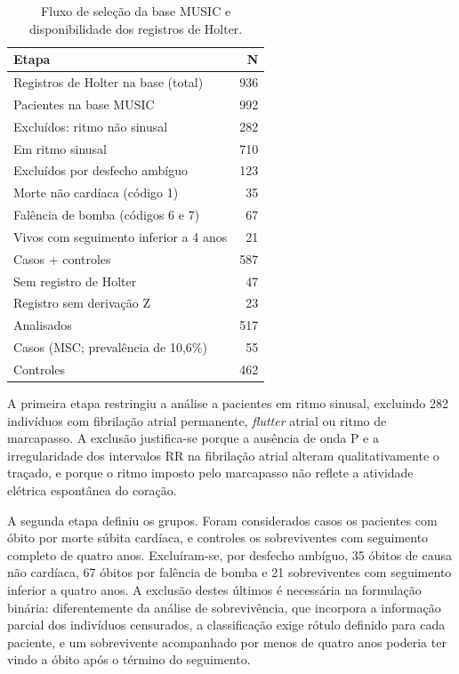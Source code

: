 \begin{table}[htbp]
	\centering
	\caption{Fluxo de seleção da base MUSIC e disponibilidade dos registros de Holter.}
	\label{tab:fluxo-music}
	\begin{tabular}{lr}
		\hline
		\textbf{Etapa}                                & \textbf{N} \\
		\hline
		Registros de Holter na base (total)           & 936        \\
		Pacientes na base MUSIC                       & 992        \\
		\quad Excluídos: ritmo não sinusal            & 282        \\
		Em ritmo sinusal                              & 710        \\
		\quad Excluídos por desfecho ambíguo          & 123        \\
		\qquad Morte não cardíaca (código 1)          & 35         \\
		\qquad Falência de bomba (códigos 6 e 7)      & 67         \\
		\qquad Vivos com seguimento inferior a 4 anos & 21         \\
		Casos + controles                             & 587        \\
		\quad Sem registro de Holter                  & 47         \\
		\quad Registro sem derivação Z                & 23         \\
		Analisados                                    & 517        \\
		\quad Casos (MSC; prevalência de 10,6\%)      & 55         \\
		\quad Controles                               & 462        \\
		\hline
	\end{tabular}
\end{table}


A primeira etapa restringiu a análise a pacientes em ritmo sinusal,
excluindo 282 indivíduos com fibrilação atrial permanente, \textit{flutter}
atrial ou ritmo de marcapasso. A exclusão justifica-se porque a ausência de
onda P e a irregularidade dos intervalos RR na fibrilação atrial alteram
qualitativamente o traçado, e porque o ritmo imposto pelo marcapasso não
reflete a atividade elétrica espontânea do coração.

A segunda etapa definiu os grupos. Foram considerados casos os pacientes com
óbito por morte súbita cardíaca, e controles os sobreviventes com seguimento
completo de quatro anos. Excluíram-se, por desfecho ambíguo, 35 óbitos de
causa não cardíaca, 67 óbitos por falência de bomba e 21 sobreviventes com
seguimento inferior a quatro anos. A exclusão destes últimos é necessária na
formulação binária: diferentemente da análise de sobrevivência, que
incorpora a informação parcial dos indivíduos censurados, a classificação
exige rótulo definido para cada paciente, e um sobrevivente acompanhado por
menos de quatro anos poderia ter vindo a óbito após o término do seguimento.

